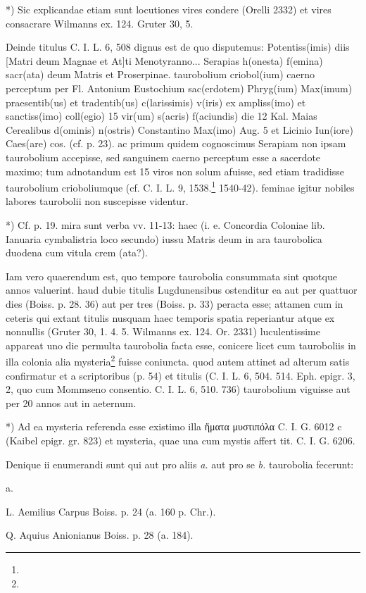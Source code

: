 \documentclass[a4paper, 11pt, oneside, polutonikogreek, german]{article}
\begin{document}
*) Sic explicandae etiam sunt locutiones vires condere (Orelli 2332) et vires consacrare Wilmanns ex. 124. Gruter 30, 5.

Deinde titulus C. I. L. 6, 508 dignus est de quo disputemus: Potentiss(imis) diis [Matri deum Magnae et At]ti Menotyranno... Serapias h(onesta) f(emina) sacr(ata) deum Matris et Proserpinae. taurobolium criobol(ium) caerno perceptum per Fl. Antonium Eustochium sac(erdotem) Phryg(ium) Max(imum) praesentib(us) et tradentib(us) c(larissimis) v(iris) ex ampliss(imo) et sanctiss(imo) coll(egio) 15 vir(um) s(acris) f(aciundis) die 12 Kal. Maias Cerealibus d(ominis) n(ostris) Constantino Max(imo) Aug. 5 et Licinio Iun(iore) Caes(are) cos. (cf. p. 23). ac primum quidem cognoscimus Serapiam non ipsam taurobolium accepisse, sed sanguinem caerno perceptum esse a sacerdote maximo; tum adnotandum est 15 viros non solum afuisse, sed etiam tradidisse taurobolium crioboliumque (cf. C. I. L. 9, 1538.\footnote{} 1540-42). feminae igitur nobiles labores taurobolii non suscepisse videntur.

*) Cf. p. 19. mira sunt verba vv. 11-13: haec (i. e. Concordia Coloniae lib. Ianuaria cymbalistria loco secundo) iussu Matris deum in ara taurobolica duodena cum vitula crem (ata?).

Iam vero quaerendum est, quo tempore taurobolia consummata sint quotque annos valuerint. haud dubie titulis Lugdunensibus ostenditur ea aut per quattuor dies (Boiss. p. 28. 36) aut per tres (Boiss. p. 33) peracta esse; attamen cum in ceteris qui extant titulis nusquam haec temporis spatia reperiantur atque ex nonnullis (Gruter 30, 1. 4. 5. Wilmanns ex. 124. Or. 2331) luculentissime appareat uno die permulta taurobolia facta esse, conicere licet cum tauroboliis in illa colonia alia mysteria\footnote{} fuisse coniuncta. quod autem attinet ad alterum satis confirmatur et a scriptoribus (p. 54) et titulis (C. I. L. 6, 504. 514. Eph. epigr. 3, 2, quo cum Mommseno consentio. C. I. L. 6, 510. 736) taurobolium viguisse aut per 20 annos aut in aeternum.

*) Ad ea mysteria referenda esse existimo illa ἤματα μυστιπόλα C. I. G. 6012 c (Kaibel epigr. gr. 823) et mysteria, quae una cum mystis affert tit. C. I. G. 6206.

Denique ii enumerandi sunt qui aut pro aliis \emph{a.} aut pro se \emph{b.} taurobolia fecerunt:

a.

L. Aemilius Carpus Boiss. p. 24 (a. 160 p. Chr.).

Q. Aquius Anionianus Boiss. p. 28 (a. 184).
\end{document}
